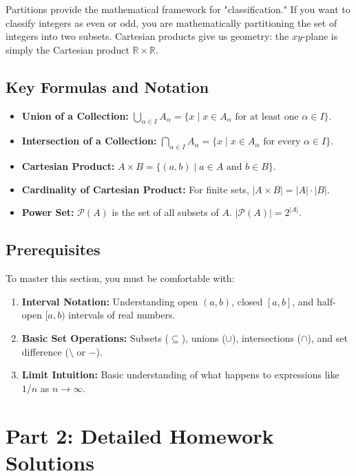 \documentclass[12pt]{article}
\begin{document}
Partitions provide the mathematical framework for "classification." If you want to classify integers as even or odd, you are mathematically partitioning the set of integers into two subsets. Cartesian products give us geometry: the $xy$-plane is simply the Cartesian product $\mathbb{R} \times \mathbb{R}$.

\subsection{Key Formulas and Notation}
\begin{itemize}
    \item \textbf{Union of a Collection:} $\bigcup_{\alpha \in I} A_\alpha = \{x \mid x \in A_\alpha \text{ for at least one } \alpha \in I\}$.
    \item \textbf{Intersection of a Collection:} $\bigcap_{\alpha \in I} A_\alpha = \{x \mid x \in A_\alpha \text{ for every } \alpha \in I\}$.
    \item \textbf{Cartesian Product:} $A \times B = \{(a, b) \mid a \in A \text{ and } b \in B\}$.
    \item \textbf{Cardinality of Cartesian Product:} For finite sets, $|A \times B| = |A| \cdot |B|$.
    \item \textbf{Power Set:} $\mathcal{P}(A)$ is the set of all subsets of $A$. $|\mathcal{P}(A)| = 2^{|A|}$.
\end{itemize}

\subsection{Prerequisites}
To master this section, you must be comfortable with:
\begin{enumerate}
    \item \textbf{Interval Notation:} Understanding open $(a, b)$, closed $[a, b]$, and half-open $[a, b)$ intervals of real numbers.
    \item \textbf{Basic Set Operations:} Subsets ($\subseteq$), unions ($\cup$), intersections ($\cap$), and set difference ($\setminus$ or $-$).
    \item \textbf{Limit Intuition:} Basic understanding of what happens to expressions like $1/n$ as $n \to \infty$.
\end{enumerate}

\newpage
\section{Part 2: Detailed Homework Solutions}
\end{document}
